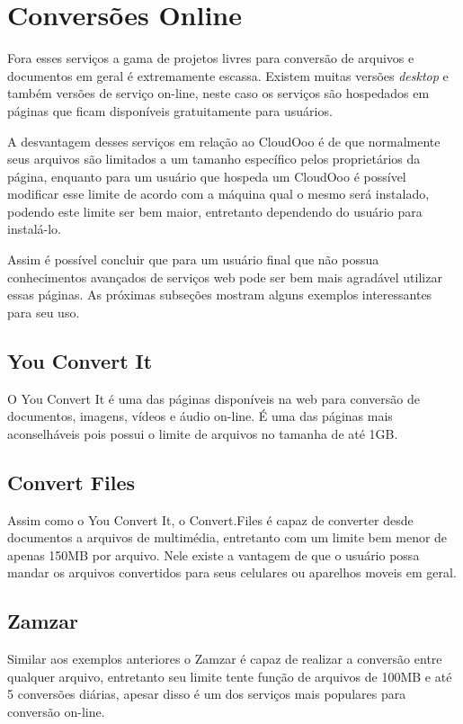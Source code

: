 \section{Conversões Online}

Fora esses serviços a gama de projetos livres para conversão de arquivos e documentos em geral é extremamente escassa. Existem muitas versões \textit{desktop} e também versões de serviço on-line, neste caso os serviços são hospedados em páginas que ficam disponíveis gratuitamente para usuários.

A desvantagem desses serviços em relação ao CloudOoo é de que normalmente seus arquivos são limitados a um tamanho específico pelos proprietários da página, enquanto para um usuário que hospeda um CloudOoo é possível modificar esse limite de acordo com a máquina qual o mesmo será instalado, podendo este limite ser bem maior, entretanto dependendo do usuário para instalá-lo.

Assim é possível concluir que para um usuário final que não possua conhecimentos avançados de serviços web pode ser bem mais agradável utilizar essas páginas. As próximas subseções mostram alguns exemplos interessantes para seu uso.

\subsection{You Convert It}

O You Convert It é uma das páginas disponíveis na web para conversão de documentos, imagens, vídeos e áudio on-line. É uma das páginas mais aconselháveis pois possui o limite de arquivos no tamanha de até 1GB.

\subsection{Convert Files}

Assim como o You Convert It, o Convert.Files é capaz de converter desde documentos a arquivos de multimédia, entretanto com um limite bem menor de apenas 150MB por arquivo. Nele existe a vantagem de que o usuário possa mandar os arquivos convertidos para seus celulares ou aparelhos moveis em geral.

\subsection{Zamzar}

Similar aos exemplos anteriores o Zamzar é capaz de realizar a conversão entre qualquer arquivo, entretanto seu limite tente função de arquivos de 100MB e até 5 conversões diárias, apesar disso é um dos serviços mais populares para conversão on-line.

